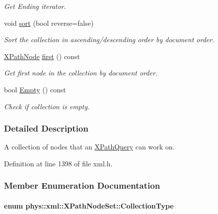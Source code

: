 \begin{DoxyCompactItemize}
\begin{DoxyCompactList}\small\item\em Get Ending iterator. \item\end{DoxyCompactList}\item 
void \hyperlink{classphys_1_1xml_1_1XPathNodeSet_a509bb7206dfc0fa79887c7ab7c5999db}{sort} (bool reverse=false)
\begin{DoxyCompactList}\small\item\em Sort the collection in ascending/descending order by document order. \item\end{DoxyCompactList}\item 
\hyperlink{classphys_1_1xml_1_1XPathNode}{XPathNode} \hyperlink{classphys_1_1xml_1_1XPathNodeSet_ae38baf21701ebbe42af3abfb6976d100}{first} () const 
\begin{DoxyCompactList}\small\item\em Get first node in the collection by document order. \item\end{DoxyCompactList}\item 
bool \hyperlink{classphys_1_1xml_1_1XPathNodeSet_a91fa85dbf474c51bc7a9df1baf38d43a}{Empty} () const 
\begin{DoxyCompactList}\small\item\em Check if collection is empty. \item\end{DoxyCompactList}\end{DoxyCompactItemize}


\subsubsection{Detailed Description}
A collection of nodes that an \hyperlink{classphys_1_1xml_1_1XPathQuery}{XPathQuery} can work on. 

Definition at line 1398 of file xml.h.



\subsubsection{Member Enumeration Documentation}
\hypertarget{classphys_1_1xml_1_1XPathNodeSet_ab178d39e119369702541033c067a995c}{
\paragraph[{CollectionType}]{\setlength{\rightskip}{0pt plus 5cm}enum {\bf phys::xml::XPathNodeSet::CollectionType}}\hfill}
\label{de/dc2/classphys_1_1xml_1_1XPathNodeSet_ab178d39e119369702541033c067a995c}


